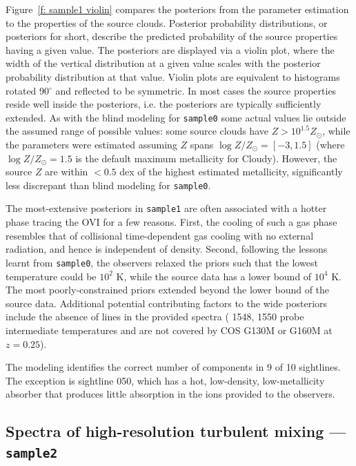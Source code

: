 \documentclass[fleqn,usenatbib]{mnras}
\begin{document}
Figure~\ref{f: sample1 violin} compares the posteriors from the parameter estimation to the properties of the source clouds.
Posterior probability distributions, or posteriors for short, describe the predicted probability of the source properties having a given value.
The posteriors are displayed via a violin plot,
where the width of the vertical distribution at a given value scales with the posterior probability distribution at that value.
Violin plots are equivalent to histograms rotated 90$^\circ$ and reflected to be symmetric.
In most cases the source properties reside well inside the posteriors, i.e. the posteriors are typically sufficiently extended.
As with the blind modeling for \texttt{sample0} some actual values lie outside the assumed range of possible values: 
some source clouds have $Z > 10^{1.5} Z_\odot$, while the parameters were estimated assuming $Z$ spans $\log Z/Z_\odot = [-3, 1.5]$ (where $\log Z/Z_\odot = 1.5$ is the default maximum metallicity for Cloudy).
However, the source $Z$ are within $< 0.5$ dex of the highest estimated metallicity, significantly less discrepant than blind modeling for \texttt{sample0}.

The most-extensive posteriors in \texttt{sample1} are often associated with a hotter phase tracing the OVI for a few reasons.
First, the cooling of such a gas phase resembles that of collisional time-dependent gas cooling with no external radiation, and hence is independent of density.
Second, following the lessons learnt from \texttt{sample0}, the observers relaxed the priors such that the lowest temperature could be $10^2$ K, while the source data has a lower bound of $10^4$ K.
The most poorly-constrained priors extended beyond the lower bound of the source data.
Additional potential contributing factors to the wide posteriors include the absence of  lines in the provided spectra ( 1548, 1550 probe intermediate temperatures and are not covered by COS G130M or G160M at $z=0.25$).

The modeling identifies the correct number of components in 9 of 10 sightlines.
The exception is sightline 050, which has a hot, low-density, low-metallicity absorber that produces little absorption in the ions provided to the observers.

\subsection{Spectra of high-resolution turbulent mixing --- \texttt{sample2}}
\label{s: results -- sample2}
\end{document}
